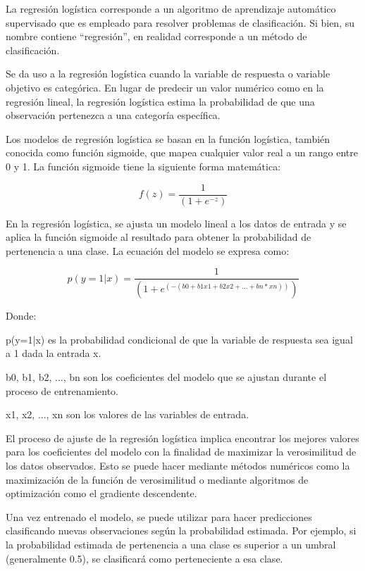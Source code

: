 La regresión logística corresponde a un algoritmo de aprendizaje automático supervisado que es empleado para resolver problemas de clasificación. Si bien, su nombre contiene “regresión”, en realidad corresponde a un método de clasificación.

Se da uso a la regresión logística cuando la variable de respuesta o variable objetivo es categórica. En lugar de predecir un valor numérico como en la regresión lineal, la regresión logística estima la probabilidad de que una observación pertenezca a una categoría específica.

Los modelos de regresión logística se basan en la función logística, también conocida como función sigmoide, que mapea cualquier valor real a un rango entre 0 y 1. La función sigmoide tiene la siguiente forma matemática:

\begin{equation*}
    f(z) = \frac{1}{(1 + e^{-z})}
\end{equation*}

En la regresión logística, se ajusta un modelo lineal a los datos de entrada y se aplica la función sigmoide al resultado para obtener la probabilidad de pertenencia a una clase. La ecuación del modelo se expresa como:

\begin{equation*}
    p(y=1|x) = \frac{1}{(1 + e^{(-(b0 + b1x1 + b2x2 + ... + bn*xn))})}
\end{equation*}

Donde:

p(y=1|x) es la probabilidad condicional de que la variable de respuesta sea igual a 1 dada la entrada x.

b0, b1, b2, ..., bn son los coeficientes del modelo que se ajustan durante el proceso de entrenamiento.

x1, x2, ..., xn son los valores de las variables de entrada.

El proceso de ajuste de la regresión logística implica encontrar los mejores valores para los coeficientes del modelo con la finalidad de maximizar la verosimilitud de los datos observados. Esto se puede hacer mediante métodos numéricos como la maximización de la función de verosimilitud o mediante algoritmos de optimización como el gradiente descendente.

Una vez entrenado el modelo, se puede utilizar para hacer predicciones clasificando nuevas observaciones según la probabilidad estimada. Por ejemplo, si la probabilidad estimada de pertenencia a una clase es superior a un umbral (generalmente 0.5), se clasificará como perteneciente a esa clase.

